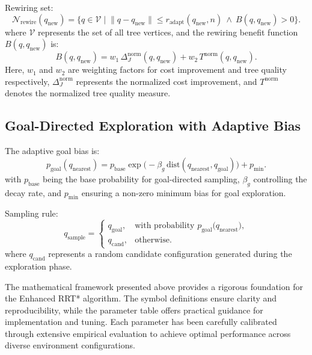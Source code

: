 \documentclass[pdflatex,sn-mathphys-num]{sn-jnl}
\theoremstyle{thmstyleone}%
\theoremstyle{thmstyletwo}%
\theoremstyle{thmstylethree}%
\begin{document}
Rewiring set:
\begin{equation}
    \mathcal{N}_{\mathrm{rewire}}(q_{\mathrm{new}})
    = \big\{ q \in \mathcal{V}\; \big|\; \|q-q_{\mathrm{new}}\|\le r_{\mathrm{adapt}}(q_{\mathrm{new}},n)\ \wedge\ B(q,q_{\mathrm{new}})>0 \big\}.
\end{equation}
where $\mathcal{V}$ represents the set of all tree vertices, and the rewiring benefit function $B(q, q_{\mathrm{new}})$ is:
\begin{equation}
    B(q, q_{\mathrm{new}}) =
w_1\,\Delta^{\mathrm{norm}}_{J}(q, q_{\mathrm{new}})
+ w_2\,T^{\mathrm{norm}}(q, q_{\mathrm{new}}).
\end{equation}
Here, $w_1$ and $w_2$ are weighting factors for cost improvement and tree quality respectively, $\Delta^{\mathrm{norm}}_{J}$ represents the normalized cost improvement, and $T^{\mathrm{norm}}$ denotes the normalized tree quality measure.

\subsection{Goal-Directed Exploration with Adaptive Bias}\label{subsec5}

The adaptive goal bias is:
\begin{equation}
    p_{\mathrm{goal}}(q_{\mathrm{nearest}})
    = p_{\mathrm{base}} \exp\!\big(-\beta_g\,\mathrm{dist}(q_{\mathrm{nearest}},q_{\mathrm{goal}})\big)
    + p_{\min}.
\end{equation}
with $p_{\mathrm{base}}$ being the base probability for goal-directed sampling, $\beta_g$ controlling the decay rate, and $p_{\min}$ ensuring a non-zero minimum bias for goal exploration.

Sampling rule:
\begin{equation}
    q_{\mathrm{sample}} =
\begin{cases}
q_{\mathrm{goal}}, & \text{with probability } p_{\mathrm{goal}}\!\big(q_{\mathrm{nearest}}\big),\\
q_{\mathrm{cand}}, & \text{otherwise.}
\end{cases}
\end{equation}
where $q_{\mathrm{cand}}$ represents a random candidate configuration generated during the exploration phase.

The mathematical framework presented above provides a rigorous foundation for the Enhanced RRT* algorithm. The symbol definitions ensure clarity and reproducibility, while the parameter table offers practical guidance for implementation and tuning. Each parameter has been carefully calibrated through extensive empirical evaluation to achieve optimal performance across diverse environment configurations.
\end{document}
